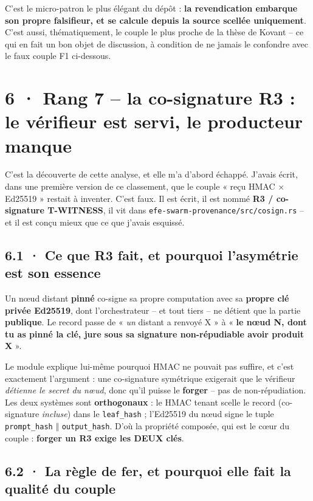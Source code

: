 \documentclass[10pt]{article}
\newcommand{\code}[1]{\texttt{\small #1}}
\newcommand{\x}{$\times$}
\begin{document}
C'est le micro-patron le plus élégant du dépôt : \textbf{la revendication embarque son propre
falsifieur, et se calcule depuis la source scellée uniquement}. C'est aussi, thématiquement, le couple
le plus proche de la thèse de Kovant -- ce qui en fait un bon objet de discussion, à condition de ne
jamais le confondre avec le faux couple F1 ci-dessous.

\section{6 · Rang 7 -- la co-signature R3 : le vérifieur est servi, le producteur manque}

C'est la découverte de cette analyse, et elle m'a d'abord échappé. J'avais écrit, dans une première
version de ce classement, que le couple « reçu HMAC \x{} Ed25519 » restait à inventer. C'est faux. Il
est écrit, il est nommé \textbf{R3 / co-signature T-WITNESS}, il vit dans
\code{efe-swarm-provenance/src/cosign.rs} -- et il est conçu mieux que ce que j'avais esquissé.

\subsection{6.1 · Ce que R3 fait, et pourquoi l'asymétrie est son essence}

Un n\oe ud distant \textbf{pinné} co-signe sa propre computation avec sa \textbf{propre clé privée
Ed25519}, dont l'orchestrateur -- et tout tiers -- ne détient que la partie \textbf{publique}. Le
record passe de « \emph{un} distant a renvoyé X » à « \textbf{le n\oe ud N, dont tu as pinné la clé,
jure sous sa signature non-répudiable avoir produit X} ».

Le module explique lui-même pourquoi HMAC ne pouvait pas suffire, et c'est exactement l'argument :
une co-signature symétrique exigerait que le vérifieur \emph{détienne le secret du n\oe ud}, donc
qu'il puisse le \textbf{forger} -- pas de non-répudiation. Les deux systèmes sont \textbf{orthogonaux} :
le HMAC tenant scelle le record (co-signature \emph{incluse}) dans le \code{leaf\_hash} ; l'Ed25519 du
n\oe ud signe le tuple \code{prompt\_hash} $\Vert$ \code{output\_hash}. D'où la propriété composée, qui
est le c\oe ur du couple : \textbf{forger un R3 exige les DEUX clés}.

\subsection{6.2 · La règle de fer, et pourquoi elle fait la qualité du couple}
\end{document}
